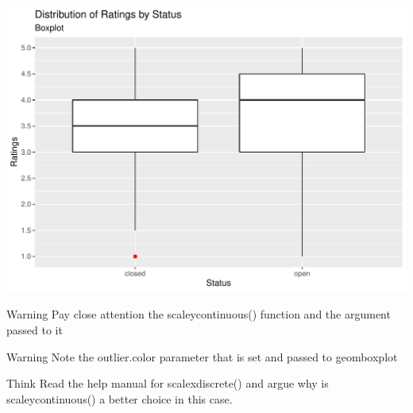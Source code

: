 \documentclass[12pt]{book}\usepackage{knitr}
\begin{document}
\begin{knitrout}
\begin{kframe}
{\ttfamily\noindent\color{warningcolor}{\#\# Warning: Use of `cleansedBusiness\$stars` is discouraged. Use `stars` instead.}}\end{kframe}
\includegraphics[width=\maxwidth]{figure/Boxplot-1} 
\begin{kframe}\begin{alltt}
\end{alltt}
\end{kframe}
\end{knitrout}

\begin{DIY}{Warning}
\noindent Pay close attention the scale\textunderscore y\textunderscore continuous() function and the argument passed to it
\end{DIY}

\begin{DIY}{Warning}
\noindent Note the outlier$.$color parameter that is set and passed to geom\textunderscore boxplot  
\end{DIY}

\begin{DIY}{Think}
\noindent Read the help manual for scale\textunderscore x\textunderscore discrete() and argue why is scale\textunderscore y\textunderscore continuous() a better choice in this case.
\end{DIY}
\end{document}
